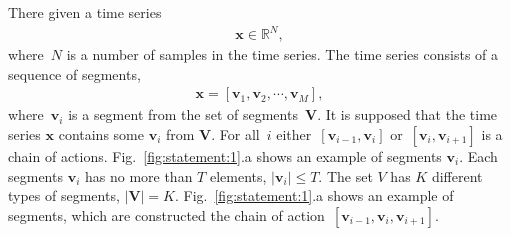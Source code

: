 \documentclass[12pt, twoside]{article}
\numberwithin{equation}{section}
\begin{document}
There given a time series
\begin{equation}
\label{eq:st:1}
\begin{aligned}
\textbf{x} \in \mathbb{R}^{N},
\end{aligned}
\end{equation}
where~$N$ is a number of samples in the time series. The time series consists of a sequence of segments,
\begin{equation}
\label{eq:st:2}
\begin{aligned}
\textbf{x} = [\textbf{v}_1, \textbf{v}_2, \cdots, \textbf{v}_M],
\end{aligned}
\end{equation}
where~$\textbf{v}_i$ is a segment from the set of segments~$\mathbf{V}$. 
It is supposed that the time series $\textbf{x}$ contains some $\textbf{v}_i$ from $\textbf{V}$.
For all~$i$ either~$[\textbf{v}_{i-1},\textbf{v}_{i}]$ or~$[\textbf{v}_{i},\textbf{v}_{i+1}]$  is a  chain of actions. Fig.~\ref{fig:statement:1}.a shows an example of segments $\textbf{v}_i$.
Each segments $\textbf{v}_{i}$ has no more than $T$ elements, $\left|\textbf{v}_{i}\right| \leq T$. 
The set $V$ has $K$ different types of segments, $\left|\mathbf{V}\right| = K$. 
Fig.~\ref{fig:statement:1}.a shows an example of segments, which are constructed the chain of action~$[\textbf{v}_{i-1}, \textbf{v}_{i}, \textbf{v}_{i+1}]$.


\end{document}
